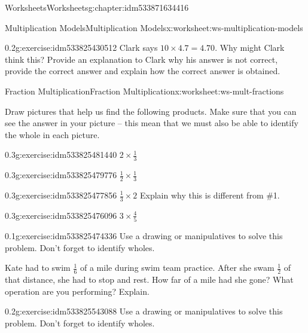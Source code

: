 \documentclass[twoside,11pt,]{book}
\begin{document}
\begin{chapterptx}{Worksheets}{}{Worksheets}{}{}{g:chapter:idm533871634416}
\begin{worksheet-section-numberless}{Multiplication Models}{}{Multiplication Models}{}{}{x:worksheet:ws-multiplication-models}
\begin{divisionexercise}{18}{}{0.2}{g:exercise:idm533825430512}
Clark says \(10 \times 4.7=4.70 \). Why might Clark think this? Provide an explanation to Clark why his answer is not correct, provide the correct answer and explain how the correct answer is obtained.%
\end{divisionexercise}%
\end{worksheet-section-numberless}
\restoregeometry
%
%
\typeout{************************************************}
\typeout{************************************************}
%
\begin{worksheet-section-numberless}{Fraction Multiplication}{}{Fraction Multiplication}{}{}{x:worksheet:ws-mult-fractions}
\begin{introduction}{}%
Draw pictures that help us find the following products.  Make sure that you can see the answer in your picture – this mean that we must also be able to identify the whole in each picture.%
\end{introduction}%
\begin{divisionexercise}{1}{}{0.3}{g:exercise:idm533825481440}%
\(2 \times \frac{1}{3} \)%
\end{divisionexercise}%
\begin{divisionexercise}{2}{}{0.3}{g:exercise:idm533825479776}%
\(\frac{1}{2} \times \frac{1}{3} \)%
\end{divisionexercise}%
\clearpage
\begin{divisionexercise}{3}{}{0.3}{g:exercise:idm533825477856}%
\(\frac{1}{3} \times 2  \)  Explain why this is different from \#1.%
\end{divisionexercise}%
\begin{divisionexercise}{4}{}{0.3}{g:exercise:idm533825476096}%
\(3 \times \frac{4}{5} \)%
\end{divisionexercise}%
\begin{divisionexercise}{5}{}{0.1}{g:exercise:idm533825474336}%
Use a drawing or manipulatives to solve this problem. Don’t forget to identify wholes.%
\par
Kate had to swim \(\frac{1}{6} \) of a mile during swim team practice.  After she swam \(\frac{1}{2} \) of that distance, she had to stop and rest. How far of a mile had she gone? What operation are you performing? Explain.%
\end{divisionexercise}%
\clearpage
\begin{divisionexercise}{6}{}{0.2}{g:exercise:idm533825543088}%
Use a drawing or manipulatives to solve this problem. Don’t forget to identify wholes.%

\end{divisionexercise}
\end{worksheet-section-numberless}
\end{chapterptx}
\end{document}
